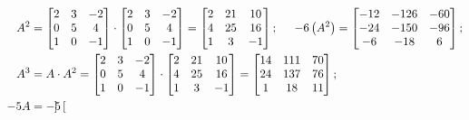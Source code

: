     \[
        \begin{aligned}
            A^2 &= 
            \begin{bmatrix}
                2 & 3 & -2 \\ 
                0 & 5 & 4 \\ 
                1 & 0 & -1
            \end{bmatrix}
            \cdot
            \begin{bmatrix}
                2 & 3 & -2 \\ 
                0 & 5 & 4 \\ 
                1 & 0 & -1
            \end{bmatrix}
            =
            \begin{bmatrix}
                2 & 21 & 10 \\ 
                4 & 25 & 16 \\
                1 & 3 & -1
            \end{bmatrix};
            \hspace{0.5cm}
            -6 \left(A^2\right) =
            \begin{bmatrix}
                -12 & -126 & -60 \\ 
                -24 & -150 & -96 \\
                -6 & -18 & 6
            \end{bmatrix};
            \\
            A^3 &= A \cdot A^2 = 
            \begin{bmatrix}
                2 & 3 & -2 \\ 
                0 & 5 & 4 \\ 
                1 & 0 & -1
            \end{bmatrix}
            \cdot
            \begin{bmatrix}
                2 & 21 & 10 \\ 
                4 & 25 & 16 \\
                1 & 3 & -1
            \end{bmatrix}
            = 
            \begin{bmatrix}
                14 & 111 & 70 \\
                24 & 137 & 76 \\
                1 & 18 & 11
            \end{bmatrix};
            \\
            -5A &= 
            -5
            \begin{bmatrix}

\end{bmatrix}
\end{aligned}\]
